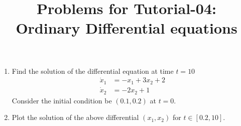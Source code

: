\documentclass[10pt,a4paper]{article}
\begin{document}
\title{Problems for Tutorial-04: \\Ordinary Differential equations}
\date{}
\maketitle
\begin{enumerate}
\item Find the solution of the differential equation at time $t = 10$ 
\begin{align*}
	\dot{x}_1 &= -x_1 + 3 x_2 + 2\\
	\dot{x}_2 &= -2 x_2 + 1
\end{align*}
Consider the initial condition be $(0.1,0.2)$ at $t = 0$. 
\item Plot the solution of the above differential $(x_1,x_2)$ for $t \in [0.2,10]$.
\end{enumerate}
\end{document}
